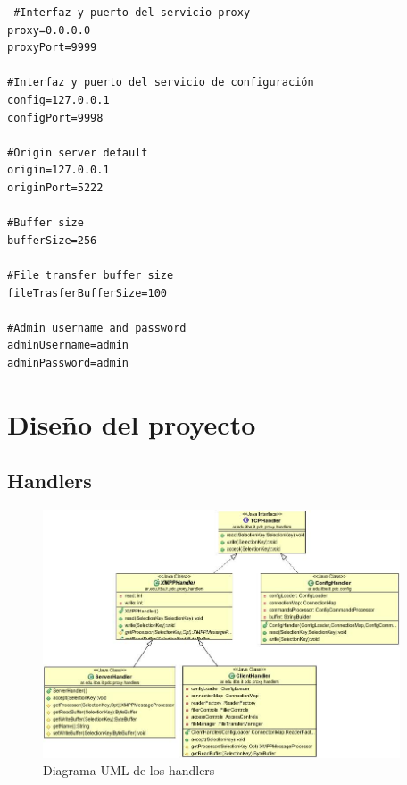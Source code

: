 \documentclass[a4paper,10pt]{article}
\begin{document}
\begin{verbatim}
 #Interfaz y puerto del servicio proxy
proxy=0.0.0.0
proxyPort=9999

#Interfaz y puerto del servicio de configuración
config=127.0.0.1
configPort=9998

#Origin server default
origin=127.0.0.1
originPort=5222

#Buffer size
bufferSize=256

#File transfer buffer size
fileTrasferBufferSize=100

#Admin username and password
adminUsername=admin
adminPassword=admin
\end{verbatim}

\newpage
\section{Diseño del proyecto}

\subsection{Handlers}
\begin{figure}[h]
	\centering
	\includegraphics[width=400px]{UML/Handlers}  
	\caption{Diagrama UML de los handlers}
	\label{figure:Handlers}
\end{figure}

\newpage
\end{document}
